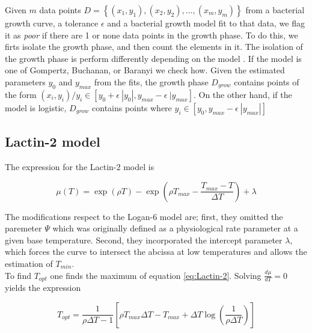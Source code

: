 \documentclass[titlepage,11pt]{article}
\begin{document}
\begin{linenumbers}
		Given $ m $ data points $ D =  \left\{(x_1, y_1), (x_2, y_2), ... , (x_m, y_m)\right\} $ from a bacterial growth curve, a tolerance $ \epsilon $ and a bacterial growth model fit to that data, we flag it as \textit{poor} if there are 1 or none data points in the growth phase. To do this, we firts isolate the growth phase, and then count the elements in it. The isolation of the growth phase is perform differently depending on the model . 
		If the model is one of Gompertz, Buchanan, or Baranyi we check how. Given the estimated parameters $ y_{0} $ and $ y_{max} $ from the fits, the growth phase $D_{grow} $ contains points of the form $ (x_i, y_i) / y_i \in [y_0 + \epsilon\ |y_0| , y_{max} - \epsilon \ |y_{max}]$. On the other hand, if the model is logistic, $ D_{grow} $ contains points where $ y_i \in [y_0, y_{max}-\epsilon \ |y_{max}|] $
		
		\subsection{Lactin-2 model}\label{subsec:Lactin-2}
		The expression for the Lactin-2 model is 
		\begin{linenomath*}
			\begin{equation}\label{eq:Lactin-2}
			\mu(T) = \exp(\rho T) - \exp\left(\rho T_{max} - \frac{T_{max}-T}{\Delta T}\right) + \lambda	
			\end{equation}
		\end{linenomath*}
		
		The modifications respect to the Logan-6 model are; first, they omitted the paremeter $ \Psi $ which was originally defined as a physiological rate parameter at a given base temperature. Second, they incorporated the intercept parameter $ \lambda $, which forces the curve to intersect the abcissa at low temperatures and allows the estimation of $ T_{min} $.\\
		To find $ T_{opt} $ one finds the maximum of equation \ref{eq:Lactin-2}. Solving $ \frac{d\mu}{dT}  = 0$ yields the expression
		\begin{linenomath*}
			\begin{equation}\label{eq:Topt}
			T_{opt} = \frac{1}{\rho\Delta T  -1}\left[\rho T_{max} \Delta T - T_{max} + \Delta T \log\left(\frac{1}{\rho\Delta T }\right) \right]
			\end{equation}
		\end{linenomath*}
	\end{linenumbers}
	
	\newpage
	
	
\end{document}
